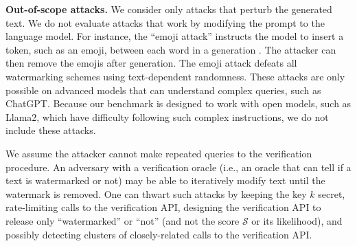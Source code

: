 \smallskip\noindent\textbf{Out-of-scope attacks.}
%
We consider only attacks that perturb the generated text.
%
We do not evaluate attacks that work by modifying the prompt to the language model.
%
For instance, the ``emoji attack'' instructs the model to insert a token, such as an emoji, between each word in a generation \citep{kirchenbauer_watermark_2023}.
%
The attacker can then remove the emojis after generation.
%
The emoji attack defeats all watermarking schemes using text-dependent randomness.
%
These attacks are only possible on advanced models that can understand complex queries, such as ChatGPT.
%
Because our benchmark is designed to work with open models, such as Llama2, which have difficulty following such complex instructions, we do not include these attacks.

We assume the attacker cannot make repeated queries to the verification procedure.
%
An adversary with a verification oracle (i.e., an oracle that can tell if a text is watermarked or not) may be able to iteratively modify text until the watermark is removed.
%
One can thwart such attacks by keeping the key $k$ secret, rate-limiting calls to the verification API, designing the verification API to release only ``watermarked'' or ``not'' (and not the score $\mathcal{S}$ or its likelihood), and possibly detecting clusters of closely-related calls to the verification API.
